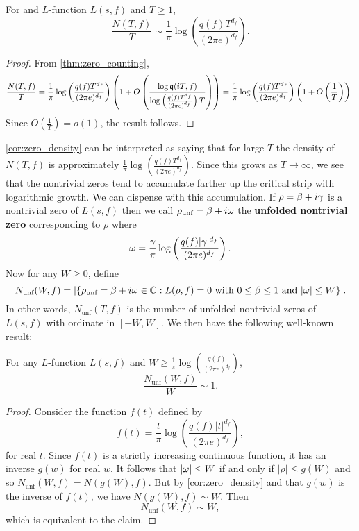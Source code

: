     \begin{corollary}\label{cor:zero_density}
      For and $L$-function $L(s,f)$ and $T \ge 1$,
      \[
        \frac{N(T,f)}{T} \sim \frac{1}{\pi}\log\left(\frac{q(f)T^{d_{f}}}{(2\pi e)^{d_{f}}}\right).
      \]
    \end{corollary}
    \begin{proof}
      From \cref{thm:zero_counting},
      \[
        \frac{N(T,f)}{T} = \frac{1}{\pi}\log\left(\frac{q(f)T^{d_{f}}}{(2\pi e)^{d_{f}}}\right)\left(1+O\left(\frac{\log{\mathfrak{q}(iT,f)}}{\log\left(\frac{q(f)T^{d_{f}}}{(2\pi e)^{d_{f}}}\right)T}\right)\right) = \frac{1}{\pi}\log\left(\frac{q(f)T^{d_{f}}}{(2\pi e)^{d_{f}}}\right)\left(1+O\left(\frac{1}{T}\right)\right).
      \]
      Since $O\left(\frac{1}{T}\right) = o(1)$, the result follows.
    \end{proof}

    \cref{cor:zero_density} can be interpreted as saying that for large $T$ the density of $N(T,f)$ is approximately $\frac{1}{\pi}\log\left(\frac{q(f)T^{d_{f}}}{(2\pi e)^{d_{f}}}\right)$. Since this grows as $T \to \infty$, we see that the nontrivial zeros tend to accumulate farther up the critical strip with logarithmic growth. We can dispense with this accumulation. If $\rho = \beta+i\gamma$ is a nontrivial zero of $L(s,f)$ then we call $\rho_{\text{unf}} = \beta+i\omega$ the \textbf{unfolded nontrivial zero} corresponding to $\rho$ where
    \[
      \omega = \frac{\gamma}{\pi}\log\left(\frac{q(f)|\gamma|^{d_{f}}}{(2\pi e)^{d_{f}}}\right).
    \]
    Now for any $W \ge 0$, define
    \[
      N_{\text{unf}}(W,f) = |\{\rho_{\text{unf}} = \beta+i\omega \in \mathbb{C}:\text{$L(\rho,f) = 0$ with $0 \le \beta \le 1$ and $|\omega| \le W$}\}|.
    \]
    In other words, $N_{\text{unf}}(T,f)$ is the number of unfolded nontrivial zeros of $L(s,f)$ with ordinate in $[-W,W]$. We then have the following well-known result:

    \begin{proposition}\label{prop:unfolded_zeros_are_evenly_spaced}
    For any $L$-function $L(s,f)$ and $W \ge \frac{1}{\pi}\log\left(\frac{q(f)}{(2\pi e)^{d_{f}}}\right)$,
    \[
      \frac{N_{\text{unf}}(W,f)}{W} \sim 1.
    \]
    \end{proposition}
    \begin{proof}
      Consider the function $f(t)$ defined by
      \[
        f(t) = \frac{t}{\pi}\log\left(\frac{q(f)|t|^{d_{f}}}{(2\pi e)^{d_{f}}}\right),
      \]
      for real $t$. Since $f(t)$ is a strictly increasing continuous function, it has an inverse $g(w)$ for real $w$. It follows that $|\omega| \le W$ if and only if $|\rho| \le g(W)$ and so $N_{\text{unf}}(W,f) = N(g(W),f)$. But by \cref{cor:zero_density} and that $g(w)$ is the inverse of $f(t)$, we have $N(g(W),f) \sim W$. Then
      \[
        N_{\text{unf}}(W,f) \sim W,
      \]
      which is equivalent to the claim.
    \end{proof}

